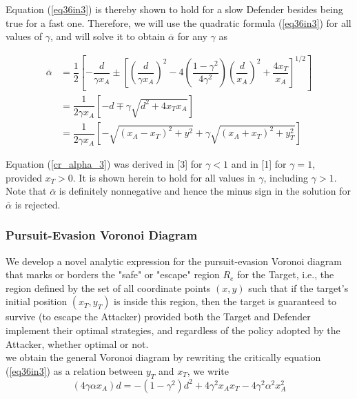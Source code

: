 \documentclass{beamer}
\begin{document}
\begin{frame}
Equation (\ref{eq36in3}) is thereby shown to hold for a slow Defender besides being true for a fast one.
Therefore, we will use the quadratic formula (\ref{eq36in3}) for all values of $\gamma$, and will solve it to obtain $\overline{\alpha}$ for any $\gamma$ as 

\begin{equation}
\begin{split}
\overline{\alpha}&=\dfrac{1}{2}[-\dfrac{d}{\gamma x_{A}}
\pm[(\dfrac{d}{\gamma x_{A}})^{2}-4(\dfrac{1-\gamma^{2}}{4\gamma^{2}})(\dfrac{d}{x_{A}})^{2}+\dfrac{4x_{T}}{x_{A}}]^{1/2} ]\\
&= \dfrac{1}{2\gamma x_{A}} [-d \mp \gamma \sqrt{d^{2}+4 x_{T} x_{A}}]\\
&= \dfrac{1}{2 \gamma x_{A}} [- \sqrt{(x_{A}-x_{T})^{2} + y^{2}}+ \gamma \sqrt{(x_{A}+ x_{T})^{2}+y_{T}^{2}}]
\end{split}
\label{cr_alpha_3}
\end{equation}

Equation (\ref{cr_alpha_3}) was derived in [3] for $\gamma<1$ and in [1] for $\gamma=1$, provided $x_{T}>0$. It is shown herein to hold for all values in $\gamma$, including $\gamma>1$. Note that $\overline{\alpha}$ is definitely nonnegative and hence the minus sign in the solution for $\overline{\alpha}$ is rejected.
\end{frame}
\begin{frame}
\frametitle{Pursuit-Evasion Voronoi Diagram}
We develop a novel analytic expression for the pursuit-evasion Voronoi diagram that marks or borders the "safe" or "escape" region $R_{e}$ for the Target, i.e., the region defined by the set of all coordinate points $(x,y)$ such that if the target's initial position $(x_{T},y_{T})$ is inside this region, then the target is guaranteed to survive (to escape the Attacker) provided both the Target and Defender implement their optimal strategies, and regardless of the policy adopted by the Attacker, whether optimal or not.\\
we obtain the general Voronoi diagram by rewriting the critically equation (\ref{eq36in3}) as a relation between $y_{T}$ and $x_{T}$, we write
\begin{equation}
(4\gamma \alpha x_{A})d= -(1-\gamma^{2})d^{2}
+4 \gamma^{2} x_{A} x_{T}
-4 \gamma^{2} \alpha^{2} x_{A}^{2}
\label{cr-eq-Vd}
\end{equation}
\end{frame}
\end{document}
